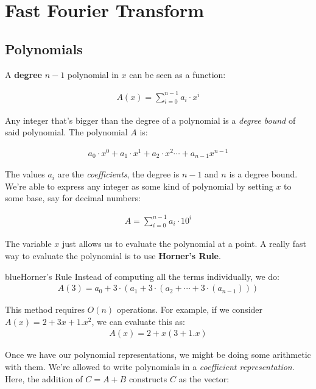 \documentclass[11pt,a4paper,titlepage,dvipsnames,cmyk]{scrartcl}
\begin{document}
\section{Fast Fourier Transform}%
\label{sec:fft}

\subsection{Polynomials}%
\label{sub:Polynomials}
A \textbf{degree} $n-1$ polynomial in $x$ can be seen as a function:

\begin{align*}
    A(x) = \sum^{n-1}_{i=0}a_i \cdot x^i
\end{align*}

Any integer that's bigger than the degree of a polynomial is a
\textit{degree bound} of said polynomial. The polynomial $A$ is:

\begin{align*}
    a_0 \cdot x^0 + a_1 \cdot x^1 + a_2 \cdot x^2 \cdots + a_{n-1}x^{n-1}
\end{align*}

The values $a_i$ are the \textit{coefficients}, the degree is $n-1$ and
$n$ is a degree bound. We're able to express any integer as some kind of
polynomial by setting $x$ to some base, say for decimal numbers:

\begin{align*}
    A = \sum^{n-1}_{i=0} a_i \cdot 10^i
\end{align*}

The variable $x$ just allows us to evaluate the polynomial at a point. A
really fast way to evaluate the polynomial is to use \textbf{Horner's
Rule}.

\begin{titlebox}{blue}{Horner's Rule}
Instead of computing all the terms individually, we do:
\begin{align*}
    A(3) = a_0 + 3 \cdot (a_1 + 3\cdot (a_2 + \cdots + 3\cdot (a_{n-1})))
\end{align*}

This method requires $O(n)$ operations. For example, if we consider $A(x) = 2 + 3x + 1.x^2$, we can evaluate this
as:
\begin{align*}
    A(x) = 2 + x(3 + 1.x)
\end{align*}

\end{titlebox}

Once we have our polynomial representations, we might be doing some
arithmetic with them. We're allowed to write polynomials in a
\textit{coefficient representation}. Here, the addition of $C = A + B$
constructs $C$ as the vector:
\end{document}
